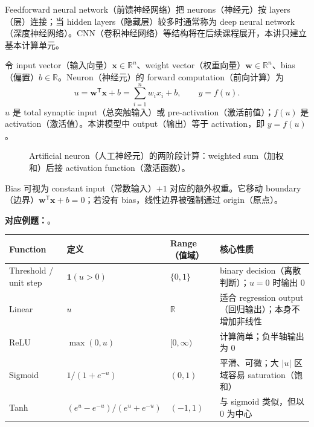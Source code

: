 Feedforward neural network（前馈神经网络）把 neurons（神经元）按 layers（层）连接；当 hidden layers（隐藏层）较多时通常称为 deep neural network（深度神经网络）。CNN（卷积神经网络）等结构将在后续课程展开，本讲只建立基本计算单元。


令 input vector（输入向量）$\bm x\in\mathbb R^n$、weight vector（权重向量）$\bm w\in\mathbb R^n$、bias（偏置）$b\in\mathbb R$。Neuron（神经元）的 forward computation（前向计算）为
\[
  \boxed{u=\bm w^{\mathsf T}\bm x+b
  =\sum_{i=1}^{n}w_i x_i+b},
  \qquad
  \boxed{y=f(u)}.
\]
$u$ 是 total synaptic input（总突触输入）或 pre-activation（激活前值）；$f(u)$ 是 activation（激活值）。本讲模型中 output（输出）等于 activation，即 $y=f(u)$。

\begin{figure}[htbp]
  \centering
  \resizebox{0.82\textwidth}{!}{}
  \caption{Artificial neuron（人工神经元）的两阶段计算：weighted sum（加权和）后接 activation function（激活函数）。}
  \label{fig:sc4001-l01-artificial-neuron}
\end{figure}

Bias 可视为 constant input（常数输入）$+1$ 对应的额外权重。它移动 boundary（边界）$\bm w^{\mathsf T}\bm x+b=0$；若没有 bias，线性边界被强制通过 origin（原点）。

\textbf{对应例题：}。


\begin{center}
\small
\begin{tabularx}{\textwidth}{@{}>{\raggedright\arraybackslash}p{2.4cm}>{\raggedright\arraybackslash}p{3.1cm}>{\raggedright\arraybackslash}p{2.2cm}X@{}}
  \toprule
  Function & 定义 & Range（值域） & 核心性质 \\
  \midrule
  Threshold / unit step & $\mathbf 1(u>0)$ & $\{0,1\}$ & binary decision（离散判断）；$u=0$ 时输出 0 \\
  Linear & $u$ & $\mathbb R$ & 适合 regression output（回归输出）；本身不增加非线性 \\
  ReLU & $\max(0,u)$ & $[0,\infty)$ & 计算简单；负半轴输出为 0 \\
  Sigmoid & $1/(1+e^{-u})$ & $(0,1)$ & 平滑、可微；大 $|u|$ 区域容易 saturation（饱和） \\
  Tanh & $(e^u-e^{-u})/(e^u+e^{-u})$ & $(-1,1)$ & 与 sigmoid 类似，但以 0 为中心 \\
  \bottomrule
\end{tabularx}
\end{center}

